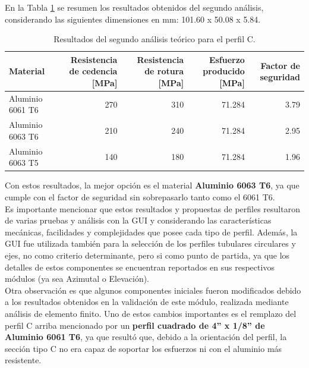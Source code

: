En la Tabla \ref{tab:perfil_C} se resumen los resultados obtenidos del segundo análisis, considerando las siguientes dimensiones en mm: 101.60 x 50.08 x 5.84.
\begin{table}[H]
  \centering
  \caption{Resultados del segundo análisis teórico para el perfil C.}
    \begin{tabular}{|p{3cm}|r|r|r|r|}
    \hline
    \textbf{Material} & \multicolumn{1}{p{2cm}|}{\textbf{Resistencia de cedencia [MPa]}} & \multicolumn{1}{p{2cm}|}{\textbf{Resistencia de rotura [MPa]}} & \multicolumn{1}{p{2cm}|}{\textbf{Esfuerzo producido [MPa]}} & \multicolumn{1}{p{2cm}|}{\textbf{Factor de seguridad}} \\
    \hline \hline
    Aluminio 6061 T6 & 270 & 310 & 71.284 & 3.79 \\
    \hline
    Aluminio 6063 T6 & 210 & 240 & 71.284 & 2.95 \\
    \hline
    Aluminio 6063 T5 & 140 & 180 & 71.284 & 1.96 \\
    \hline
    \end{tabular}%
  \label{tab:perfil_C}%
\end{table}%

Con estos resultados, la mejor opción es el material \textbf{Aluminio 6063 T6}, ya que cumple con el factor de seguridad sin sobrepasarlo tanto como el 6061 T6.\\

Es importante mencionar que estos resultados y propuestas de perfiles resultaron de varias pruebas y análisis con la GUI y considerando las características mecánicas, facilidades y complejidades que posee cada tipo de perfil. Además, la GUI fue utilizada también para la selección de los perfiles tubulares circulares y ejes, no como criterio determinante, pero si como punto de partida, ya que los detalles de estos componentes se encuentran reportados en sus respectivos módulos (ya sea Azimutal o Elevación).\\

Otra observación es que algunos componentes iniciales fueron modificados debido a los resultados obtenidos en la validación de este módulo, realizada mediante análisis de elemento finito. Uno de estos cambios importantes es el remplazo del perfil C arriba mencionado por un \textbf{perfil cuadrado de 4” x 1/8” de Aluminio 6061 T6}, ya que resultó que, debido a la orientación del perfil, la sección tipo C no era capaz de soportar los esfuerzos ni con el aluminio más resistente.\\


